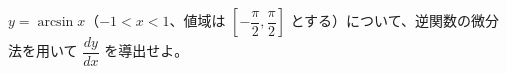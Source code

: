 
$y = \arcsin x$（$-1 < x < 1$、値域は $\left[-\dfrac{\pi}{2}, \dfrac{\pi}{2}\right]$ とする）について、逆関数の微分法を用いて $\dfrac{dy}{dx}$ を導出せよ。

